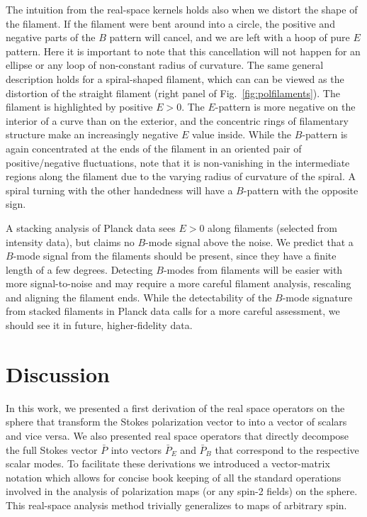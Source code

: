 \documentclass[a4paper,11pt]{article}
\def\vp#1{$\bar{P}_{#1}$ }
\def\fig#1{{Fig.~\ref{#1}}}
\begin{document}
The intuition from the real-space kernels holds also when we distort the shape of the filament.  If the filament were bent around into a circle, the positive and negative parts of the $B$ pattern will cancel, and we are left with a hoop of pure $E$ pattern. Here it is important to note that this cancellation will not happen for an ellipse or any loop of non-constant radius of curvature.
The same general description holds for a spiral-shaped filament, which can can be viewed as the distortion of the straight filament (right panel of  \fig{fig:polfilaments}).  The filament is highlighted by positive $E>0$.  The $E$-pattern is more negative on the interior of a curve than on the exterior, and the concentric rings of filamentary structure make an increasingly negative $E$ value inside. While the $B$-pattern is again concentrated at the ends of the filament in an oriented pair of positive/negative fluctuations, note that it is non-vanishing in the intermediate regions along the filament due to the varying radius of curvature of the spiral.  A spiral turning with the other handedness will have a $B$-pattern with the opposite sign.

A stacking analysis of Planck data \citep{2016A&A...586A.141P} sees $E>0$ along filaments (selected from intensity data), but claims no $B$-mode signal above the noise. We predict that a $B$-mode signal from the filaments should be present, since they have a finite length of a few degrees.  Detecting $B$-modes from filaments will be easier with more signal-to-noise and may require a more careful filament analysis, rescaling and aligning the filament ends.  While the detectability of the $B$-mode signature from stacked filaments in Planck data calls for a more careful assessment, we should see it in future, higher-fidelity data. 
%
\section{Discussion}\label{sec:discussion}
In this work, we presented a first derivation of the real space operators on the sphere that transform the Stokes polarization vector to into a vector of scalars and vice versa.  We also presented real space operators that directly decompose the full Stokes vector \vp{} into vectors \vp{E} and \vp{B} that correspond to the respective scalar modes.  To facilitate these derivations we introduced a vector-matrix notation which allows for concise book keeping of all the standard operations involved in the analysis of  polarization maps (or any spin-2 fields) on the sphere. This real-space analysis method trivially generalizes to maps of arbitrary spin.
\end{document}

